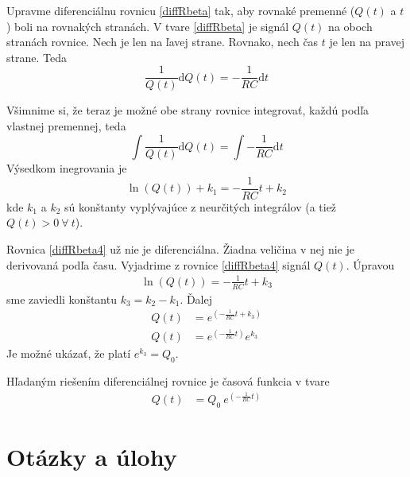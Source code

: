 \documentclass[a4paper, 10pt, ]{article}
\begin{document}
Upravme diferenciálnu rovnicu \eqref{diffRbeta} tak, aby rovnaké premenné ($Q(t)$ a $t$) boli na rovnakých stranách. V tvare \eqref{diffRbeta} je signál $Q(t)$ na oboch stranách rovnice. Nech je len na ľavej strane. Rovnako, nech čas $t$ je len na pravej strane. Teda
\begin{equation} \label{diffRbeta2}
    \frac{1}{Q(t)}\text{d}Q(t) = - \frac{1}{RC} \text{d}t
\end{equation}

Všimnime si, že teraz je možné obe strany rovnice integrovať, každú podľa vlastnej premennej, teda
\begin{equation} \label{diffRbeta3}
    \int \frac{1}{Q(t)}\text{d}Q(t) =  \int - \frac{1}{RC} \text{d}t
\end{equation}
Výsedkom inegrovania je
\begin{equation} \label{diffRbeta4}
     \ln \left(  Q(t)  \right) + k_1 =   - \frac{1}{RC} t + k_2
\end{equation}
kde $k_1$ a $k_2$ sú konštanty vyplývajúce z neurčitých integrálov (a tiež $Q(t)>0 \ \forall \ t$).

Rovnica \eqref{diffRbeta4} už nie je diferenciálna. Žiadna veličina v nej nie je derivovaná podľa času. Vyjadrime z rovnice \eqref{diffRbeta4} signál $Q(t)$. Úpravou
\begin{align}
    \ln \left(  Q(t)  \right)  =   - \frac{1}{RC} t + k_3
\end{align}
sme zaviedli konštantu $k_3 = k_2 - k_1$. Ďalej
\begin{subequations}
    \begin{align}
        Q(t)   &=  e^{\left( - \frac{1}{RC} t + k_3 \right)} \\
        Q(t)   &=  e^{\left( - \frac{1}{RC} t \right)}  e^{k_3} \label{rawRies}
    \end{align}
\end{subequations}
Je možné ukázať, že platí $e^{k_3} = Q_0$.

Hľadaným riešením diferenciálnej rovnice je časová funkcia v tvare
\begin{align}
    Q(t)   &=  Q_0 \ e^{\left( - \frac{1}{RC} t \right)}   \label{rawRies2}
\end{align}











\section{Otázky a úlohy}
\end{document}
